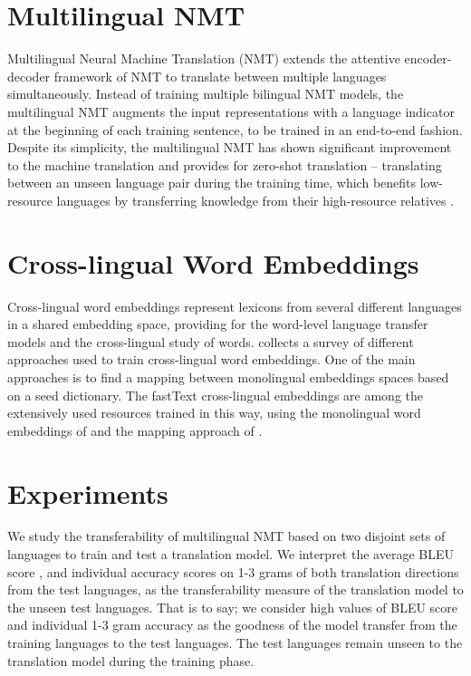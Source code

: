 \documentclass[11pt,a4paper]{article}
\begin{document}
\section{Multilingual NMT}
Multilingual Neural Machine Translation (NMT) \cite{Johnson:2016aa} extends the attentive encoder-decoder framework of NMT \citep{Bahdanau:2014aa} to translate between multiple languages simultaneously. 
Instead of training multiple bilingual NMT models, the multilingual NMT augments the input representations with a language indicator at the beginning of each training sentence, to be trained in an end-to-end fashion. 
Despite its simplicity, the multilingual NMT has shown significant improvement to the machine translation \citep{aharoni-etal-2019-massively} and provides for zero-shot translation -- translating between an unseen language pair during the training time, which benefits low-resource languages by transferring knowledge from their high-resource relatives \citep{Zoph:2016aa,Nguyen:2017aa}.


\section{Cross-lingual Word Embeddings}
Cross-lingual word embeddings represent lexicons from several different languages in a shared embedding space, providing for the word-level language transfer models and the cross-lingual study of words. 
\citet{Ruder:2019aa} collects a survey of different approaches used to train cross-lingual word embeddings.
One of the main approaches is to find a mapping between monolingual embeddings spaces based on a seed dictionary. The fastText cross-lingual embeddings are among the extensively used resources trained in this way, using the monolingual word embeddings of \citet{Bojanowski:2016aa} and the mapping approach of \citet{Joulin:2018aa}. 

\section{Experiments}
We study the transferability of multilingual NMT based on two disjoint sets of languages to train and test a translation model.
We interpret the average BLEU score \cite{papineni-etal-2002-bleu}, and individual accuracy scores on 1-3 grams of both translation directions from the test languages, as the transferability measure of the translation model to the unseen test languages. That is to say; we consider high values of BLEU score and individual 1-3 gram accuracy as the goodness of the model transfer from the training languages to the test languages. The test languages remain unseen to the translation model during the training phase. 
\end{document}
